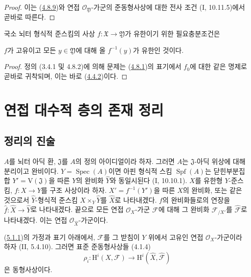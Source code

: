 \begin{proof}
이는 (\hyperref[III.4.8.9-fr]{4.8.9})와 연접
$\mathcal O_{\mathfrak Y}$-가군의 준동형사상에 대한 전사 조건
(I, 10.11.5)에서 곧바로 따른다.
\end{proof}

\begin{proposition}[4.8.11]
\label{III.4.8.11-fr}
국소 뇌터 형식적 준스킴의 사상
$f:\mathfrak X\to\mathfrak Y$가 유한이기 위한 필요충분조건은


$f$가 고유이고 모든 $y\in\mathfrak Y$에 대해 올
$f^{-1}(y)$가 유한인 것이다.
\end{proposition}

\begin{proof}
정의 (3.4.1 및 4.8.2)에 의해 문제는
(\hyperref[III.4.8.1-fr]{4.8.1})의 표기에서 $f_0$에 대한 같은
명제로 곧바로 귀착되며, 이는 바로
(\hyperref[III.4.4.2-fr]{4.4.2})이다.
\end{proof}

\section{연접 대수적 층의 존재 정리}
\label{section:III.5-fr}

\subsection{정리의 진술}
\label{subsection:III.5.1-fr}

\begin{env}[5.1.1]
\label{III.5.1.1-fr}
$A$를 뇌터 아딕 환, $\mathfrak J$를 $A$의 정의 아이디얼이라 하자.
그러면 $A$는 $\mathfrak J$-아딕 위상에 대해 분리이고 완비이다.
$Y=\operatorname{Spec}(A)$이면 아핀 형식적 스킴
$\operatorname{Spf}(A)$는 닫힌부분집합
$Y'=\mathrm V(\mathfrak J)$을 따른 $Y$의 완비화
$\widehat Y$와 동일시된다 (I, 10.10.1).
$X$를 유한형 $Y$-준스킴, $f:X\to Y$를 구조 사상이라 하자.
$X'=f^{-1}(Y')$을 따른 $X$의 완비화, 또는 같은 것으로서
$\widehat Y$-형식적 준스킴 $X\times_Y\widehat Y$를
$\widehat X$로 나타내겠다. $f$의 완비화들로의 연장을
$\widehat f:\widehat X\to\widehat Y$로 나타내겠다. 끝으로 모든
연접 $\mathcal O_X$-가군 $\mathcal F$에 대해 그 완비화
$\mathcal F_{/X'}$를 $\widehat{\mathcal F}$로 나타내겠다. 이는
연접 $\mathcal O_{\widehat X}$-가군이다.
\end{env}

\begin{proposition}[5.1.2]
\label{III.5.1.2-fr}
(\hyperref[III.5.1.1-fr]{5.1.1})의 가정과 표기 아래에서,
$\mathcal F$를 그 받침이 $Y$ 위에서 고유인 연접
$\mathcal O_X$-가군이라 하자 (II, 5.4.10). 그러면 표준
준동형사상들 (4.1.4)
\[
\rho_i:\mathrm H^i(X,\mathcal F)\longrightarrow
\mathrm H^i(\widehat X,\widehat{\mathcal F})
\]
은 동형사상이다.
\end{proposition}

